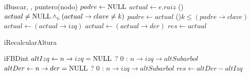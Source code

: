 \begin{Algoritmos}
  \begin{algoritmo}{iBuscar}{, , }{puntero(nodo)}
    $padre \gets \textrm{NULL}$  
    $actual \gets e.raiz$  
    \While(){$actual \neq \textrm{NULL} \land_{\mathrm{\scriptscriptstyle{L}}} (actual \to clave \neq k)$}{ %
      $padre \gets actual$ 
      \eIf(){$k \leq (padre \to clave)$}{
        $actual \gets (actual \to izq)$ 
      }{
        $actual \gets (actual \to der)$ 
      }
    }
    $res \gets actual$ 
  \end{algoritmo}


  \begin{algoritmo}{iRecalcularAltura}{}{}
  \end{algoritmo}

  \begin{algoritmo}{iFBD}{}{int}
     $altIzq \gets n \to izq = \textrm{NULL}$ ? 0 : $n \to izq \to altSubarbol$ 
     $altDer \gets n \to der = \textrm{NULL}$ ? 0 : $n \to izq \to altSubarbol$ 
    $res \gets altDer - altIzq$ 
  \end{algoritmo}


\end{Algoritmos}
